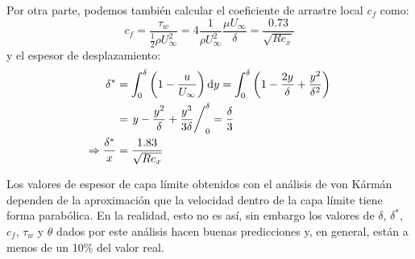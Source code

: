 Por otra parte, podemos también calcular el coeficiente de arrastre local $c_f$ como:
%
\begin{equation}\label{eq:cf_vk}
c_f = \frac{\tau_w}{\frac{1}{2}\rho U_\infty^2} = 4\frac{1}{\rho U_\infty^2}\frac{\mu U_\infty}{\delta} = \frac{0.73}{\sqrt{Re_x}}
\end{equation}
%
y el espesor de desplazamiento:
%
\begin{align}\label{eq:desplazamiento_vk}
\delta^* &= \int_0^\delta\left(1-\frac{u}{U_\infty}\right)\mathrm{d}y = \int_0^\delta \left(1-\frac{2y}{\delta}+\frac{y^2}{\delta^2}\right)\nonumber\\
&= \left. y-\frac{y^2}{\delta}+\frac{y^3}{3\delta}\right/_0^\delta = \frac{\delta}{3}\nonumber\\
\Rightarrow \frac{\delta^*}{x} &= \frac{1.83}{\sqrt{Re_x}}
\end{align}

Los valores de espesor de capa límite obtenidos con el análisis de von Kármán dependen de la aproximación que la velocidad dentro de la capa límite tiene forma parabólica. 
En la realidad, esto no es así, sin embargo los valores de $\delta$, $\delta^*$, $c_f$, $\tau_w$ y $\theta$ dados por este análisis hacen buenas predicciones y, en general, están a menos de un 10\% del valor real.



